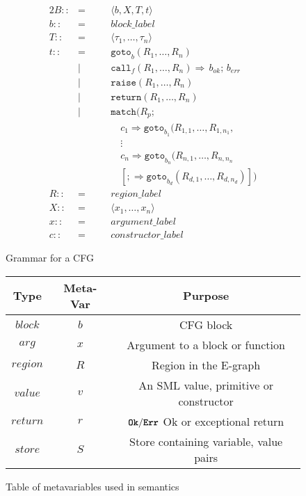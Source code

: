 \documentclass{article}
\newcommand{\bttt}[1]{\texttt{\textbf{#1}}}
\begin{document}
\begin{figure}[H]
  \centering
  \begin{alignat*}{2}
    B ::&=\quad&& \langle b, X, T, t \rangle \\
    b ::&=&& block\_label \\
    T ::&=&& \langle \tau_1, \dots, \tau_n \rangle \\
    t ::&=&& \texttt{goto}_b ( R_1, \dots, R_n ) \\
        &|&& \texttt{call}_f ( R_1, \dots, R_n) \Rightarrow \, b_{ok}; \, b_{err} \\
        &|&& \texttt{raise} ( R_1, \dots, R_n ) \\
        &|&& \texttt{return} ( R_1, \dots, R_n ) \\
        &|&& \texttt{match} ( R_p; \\
        &&&\quad c_1 \Rightarrow \texttt{goto}_{b_1} (R_{1,1}, \dots, R_{1,n_1},\\
        &&&\quad \vdots \\
        &&&\quad c_n \Rightarrow \texttt{goto}_{b_n} (R_{n,1}, \dots, R_{n,n_n} \\
        &&&\quad [;\Rightarrow \texttt{goto}_{b_{d}} (R_{d,1}, \dots, R_{d,n_d})] ) \\
    R ::&=&& region\_label \\
    X ::&=&& \langle x_1, \dots, x_n \rangle \\
    x ::&=&& argument\_label \\
    c ::&=&& constructor\_label
  \end{alignat*}
  \caption{Grammar for a CFG}
  \label{fig:CFG_grammar}
\end{figure}

\begin{figure}[H]
  \centering
  \begin{tabular}{c|c|c}
    \textbf{Type} & \textbf{Meta-Var} & \textbf{Purpose} \\\hline
    $block$       & $b$               & CFG block \\\hline
    $arg$         & $x$               & Argument to a block or function \\\hline
    $region$      & $R$               & Region in the E-graph \\\hline
    $value$       & $v$               & An SML value, primitive or constructor \\\hline
    $return$      & $r$               & $\bttt{Ok}/\bttt{Err}$ Ok or exceptional return\\\hline
    $store$       & $S$               & Store containing variable, value pairs
  \end{tabular}
  \caption{Table of metavariables used in semantics}
  \label{fig:metavars}
\end{figure}
\end{document}
